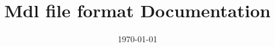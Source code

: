\documentclass[a4paper]{article}
\begin{document}
\title{Mdl file format Documentation}

\date{\today}

\maketitle
\tableofcontents


\end{document}
